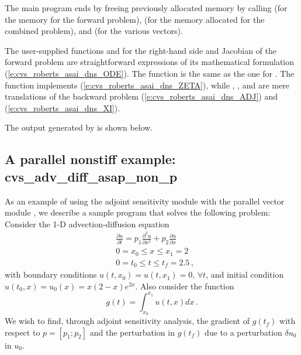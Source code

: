 The main program ends by freeing previously allocated memory by calling 
 (for the {\cvodes} memory for the forward problem),  
(for the memory allocated for the combined problem), and  
(for the various vectors).

The user-supplied functions  and  for the right-hand side and
Jacobian of the forward problem are straightforward expressions of its 
mathematical formulation (\ref{e:cvs_roberts_asai_dns_ODE}). 
The function  is the same as the one for .
The function  implements
(\ref{e:cvs_roberts_asai_dns_ZETA}), while , , and  are mere
translations of the backward problem (\ref{e:cvs_roberts_asai_dns_ADJ}) and
(\ref{e:cvs_roberts_asai_dns_XI}).

The output generated by  is shown below.



\subsection{A parallel nonstiff example: cvs\_adv\_diff\_asap\_non\_p}
\label{ss:cvs_adv_diff_asap_non_p}

As an example of using the {\cvodes} adjoint sensitivity module with the
parallel vector module {\nvecp}, we describe a sample program that solves
the following problem:  Consider the 1-D advection-diffusion equation
\begin{equation}\label{e:cvs_adv_diff_asap_non_p:orig_pde}
  \begin{split}
    & \frac{\partial u}{\partial t} = p_1 \frac{\partial^2 u}{\partial x^2} 
    + p_2 \frac{\partial u}{\partial x} \\
    & 0 = x_0 \le x \le x_1 = 2 \\
    & 0 = t_0 \le t \le t_f = 2.5 \, ,
  \end{split}
\end{equation}
with boundary conditions $u(t,x_0) = u(t,x_1) = 0 ,\, \forall t$,
and initial condition $u(t_0 , x) = u_0(x) = x(2-x)e^{2x}$. Also
consider the function
\begin{equation*}
  g(t) = \int_{x_0}^{x_1} u(t,x) dx \, .
\end{equation*}
We wish to find, through adjoint sensitivity analysis, the gradient of
$g(t_f)$ with respect to $p = [p_1 ; p_2]$ and the perturbation in $g(t_f)$
due to a perturbation $\delta u_0$ in $u_0$.

